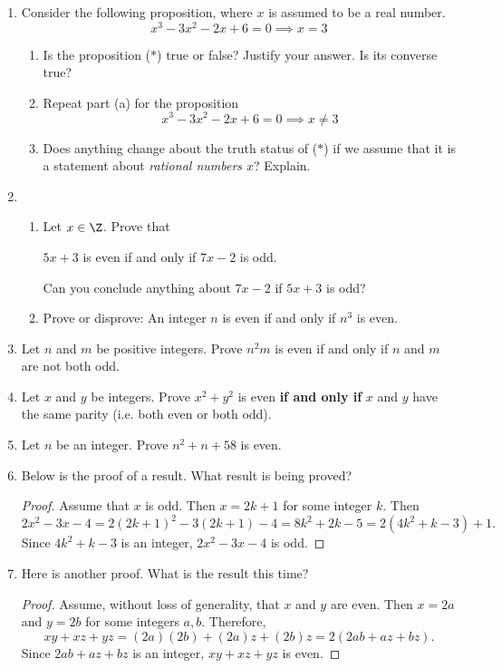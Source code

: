 \begin{enumerate}
  \item Consider the following proposition, where $x$ is assumed to be a real number.
	\[x^3-3x^2-2x+6=0\implies x=3\tag*{($\ast$)}\]
	\begin{enumerate}
  	\item Is the proposition ($\ast$) true or false? Justify your answer. Is its converse true?
  	\item Repeat part (a) for the proposition
		\[x^3-3x^2-2x+6=0\implies x\neq 3\]
  	\item Does anything change about the truth status of ($\ast$) if we assume that it is a statement about \emph{rational numbers $x$}? Explain.
	\end{enumerate}
  
	\item  
 \begin{enumerate} \item 
	Let $x\in\Z$. Prove that \begin{center} $5x+3$ is even if and only if $7x-2$ is odd.
 \end{center}
	  Can you conclude anything about $7x-2$ if $5x+3$ is odd?
	 
	  \item Prove or disprove: An integer $n$ is even if and only if $n^3$ is even. 
\end{enumerate}
   
	\item Let $n$ and $m$ be positive integers. Prove $n^2 m$ is even if and only if $n$ and $m$ are not both odd.
    
    \item Let $x$ and $y$ be integers. Prove $x^2+y^2$ is even  \textbf{if and only if} $x$ and $y$ have the same parity (i.e. both even or both odd).
    
    \item Let $n$ be an integer. Prove $n^2 + n + 58$ is even. 

	  
	\item Below is the proof of a result. What result is being proved?
  \begin{proof}
  Assume that $x$ is odd. Then $x=2k+1$ for some integer $k$. Then
  \[2x^2-3x-4=2(2k+1)^2-3(2k+1)-4=8k^2+2k-5=2(4k^2+k-3)+1.\]
  Since $4k^2+k-3$ is an integer, $2x^2-3x-4$ is odd.
  \end{proof}
 
	
	\item Here is another proof. What is the result this time?
  \begin{proof}
  Assume, without loss of generality, that $x$ and $y$ are even. Then $x=2a$ and $y=2b$ for some integers $a,b$. Therefore,
  \[xy+xz+yz=(2a)(2b)+(2a)z+(2b)z=2(2ab+az+bz).\]
  Since $2ab+az+bz$ is an integer, $xy+xz+yz$ is even.
  \end{proof}
  

\end{enumerate}
